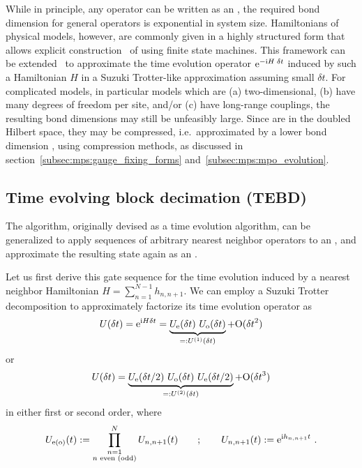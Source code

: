 While in principle, any operator can be written as an , the required bond dimension for general operators is exponential in system size.
%
Hamiltonians of physical models, however, are commonly given in a highly structured form that allows explicit construction~\cite{crosswhite2008b, crosswhite2008c, pirvu2010, paeckel2017a} of  using finite state machines.
%
This framework can be extended~\cite{zaletel2015a} to approximate the time evolution operator $\mathrm{e}^{-\mathrm{i} H \;\delta t}$ induced by such a Hamiltonian $H$ in a Suzuki Trotter-like approximation assuming small $\delta t$.
%
For complicated models, in particular models which are (a) two-dimensional, (b) have many degrees of freedom per site, and/or (c) have long-range couplings, the resulting bond dimensions may still be unfeasibly large.
%
Since  are  in the doubled Hilbert space, they may be compressed, i.e.~approximated by a lower bond dimension , using  compression methods, as discussed in section~\ref{subsec:mps:gauge_fixing_forms} and~\ref{subsec:mps:mpo_evolution}.

\subsection{Time evolving block decimation (TEBD)}
\label{subsec:mps:tebd}

The  algorithm, originally devised as a time evolution algorithm, can be generalized to apply sequences of arbitrary nearest neighbor operators to an , and approximate the resulting state again as an .

Let us first derive this gate sequence for the time evolution induced by a nearest neighbor Hamiltonian $H = \sum_{n=1}^{N-1} h_{n,n+1}$.
%
We can employ a Suzuki Trotter decomposition to approximately factorize its time evolution operator as
\begin{equation}
    \label{eq:tensornets:mps:tebd:trotterization}
    U({\delta t})
    = \mathrm{e}^{\mathrm{i} H \delta t} 
    = \underbrace{
        U_\text{e}({\delta t}) ~ U_\text{o}({\delta t})
    }_{=: U^{(1)}(\delta t)}
    + \mathrm{O}({\delta t}^2)
\end{equation}
or
\begin{equation}
    U({\delta t})
    = \underbrace{
        U_\text{e}({\delta t}/{2}) ~ U_\text{o}({\delta t}) ~ U_\text{e}({\delta t}/{2})
    }_{=: U^{(2)}(\delta t)}
    + \mathrm{O}({\delta t}^3)
\end{equation}
in either first or second order, where 
\begin{equation}
    \label{eq:tensornets:mps:tebd:trotterization_details}
    U_\text{e(o)}(t) := \prod_{\substack{n=1 \\ n \text{ even (odd)}}}^{N} U_{n,n+1}(t)
    \qquad ; \qquad
    U_{n,n+1}(t) := \mathrm{e}^{\mathrm{i} h_{n,n+1} t}
    ~.
\end{equation}


